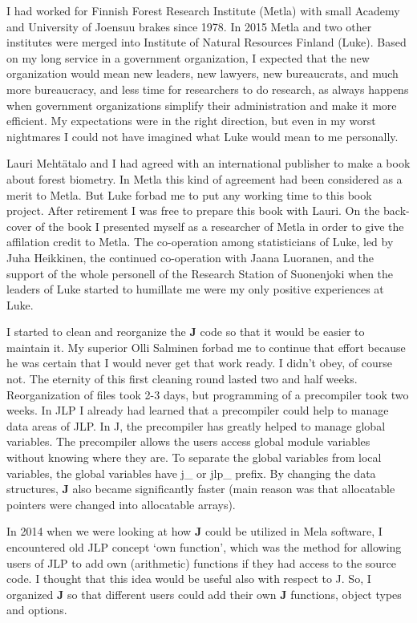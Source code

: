 I had worked for Finnish Forest Research Institute (Metla) with small Academy
and University of Joensuu brakes since 1978. In 2015 Metla and
two other institutes were merged into Institute of Natural Resources Finland (Luke).
Based on my long service in a government organization, I expected that
the new organization would mean
new leaders, new lawyers, new bureaucrats, and  much more bureaucracy,
and less time
for researchers to do research, as always happens when
government organizations simplify
their administration and make it more efficient.
My expectations were in the right direction, but even in my worst
nightmares I could not have imagined
what Luke would mean to me personally.

Lauri Mehtätalo and I had agreed with an international publisher to
make a book about forest biometry. In Metla this kind of agreement had been
considered as a merit to Metla. But Luke forbad me to put any working time
to this book project. After retirement I was free to prepare this book with Lauri.
On the back-cover of the book I presented myself as a researcher of Metla
in order to give the affilation credit to Metla.
The co-operation
among statisticians of Luke, led by Juha Heikkinen, the continued co-operation
with Jaana Luoranen, and the support of the whole personell
of the Research Station of Suonenjoki when the leaders of Luke
started to humillate me
were my only positive experiences at Luke.

I started to clean and reorganize the \textbf{J} code so that it would be easier to maintain it.
My superior Olli Salminen forbad me to continue that effort because
he was certain that I would
never get that work ready. I didn't obey, of course not. The eternity of
this first cleaning round lasted two and
half weeks. Reorganization of files took 2-3 days, but programming
of a precompiler took
two weeks. In JLP I already had learned that a precompiler could help to manage
data areas of JLP. In J, the precompiler has greatly helped to manage
global variables.
The precompiler allows the users access global module variables
without knowing where they are. To separate the global variables
from local variables, the global variables have
j\_ or jlp\_ prefix. By changing the data structures,
\textbf{J} also became significantly faster
(main reason was that allocatable pointers were changed into allocatable arrays).


In 2014 when we were looking at how \textbf{J} could be utilized in Mela software, I encountered
old JLP concept ‘own function’, which was the method for allowing users of JLP to
add own (arithmetic) functions if they had access to the source code. I thought that this
idea would be useful also with respect to J. So, I organized \textbf{J} so that
different users could add their own \textbf{J} functions,
object types and options.

